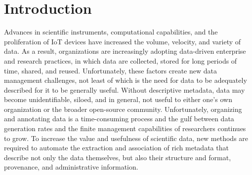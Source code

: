 \documentclass[sigconf]{acmart}
\newcommand{\kyle}[1]{}
\newcommand{\kyle}[1]{{\textcolor{purple}{ Kyle: #1 }}}
\begin{document}


\maketitle


\section{Introduction}


\kyle{this is similar to workshop paper. what are the rules on re-using text?}
Advances in scientific instruments, computational capabilities, and the proliferation of IoT devices
have increased the volume, velocity, and variety of data. 
As a result, organizations are increasingly adopting data-driven enterprise and research practices, 
in which data are collected, stored for long periods of time, shared, 
and reused.
Unfortunately, these factors create new data management challenges, 
not least of which is the need for data to be adequately described
for it to be generally useful. Without descriptive metadata, data
may become unidentifiable, siloed, and in general, 
not useful to either one's own organization or the broader open-source community. 
Unfortunately, organizing and annotating data is a time-consuming process
and the gulf between data generation rates
and the finite management capabilities of researchers
continues to grow. To increase the value and usefulness of scientific data, 
new methods are required to automate the extraction and association 
of rich metadata that describe not only the data themselves, but
also their structure and format, provenance, and administrative information.
\end{document}
